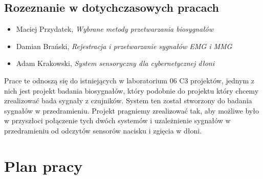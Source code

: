 \documentclass{article}
\begin{document}
\subsection{Rozeznanie w dotychczasowych pracach}
\begin{itemize}
\item Maciej Przydatek, \textit{Wybrane metody przetwarzania biosygnałów}
\item Damian Brański,  \textit{Rejestracja i przetwarzanie sygnałów EMG i MMG}
\item Adam Krakowski, \textit{System sensoryczny dla cybernetycznej dłoni}
\end{itemize}

Prace te odnoszą się do istniejących w laboratorium 06 C3 projektów, jednym z nich jest projekt badania biosygnałów, który podobnie do projektu który chcemy zrealizować bada sygnały z czujników. System ten został stworzony do badania sygnałów w przedramieniu. Projekt pragniemy zrealizować tak, aby możliwe było w przyszłoci połączenie tych dwóch systemów i uzależnienie sygnałów w przedramieniu od odczytów sensorów nacisku i zgięcia w dłoni.

\section{Plan pracy}
\end{document}
